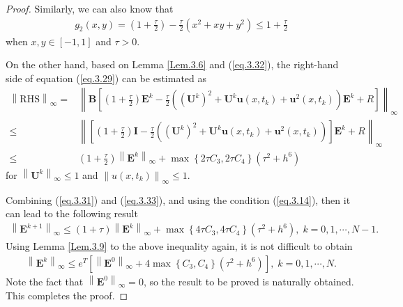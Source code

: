 \documentclass{siamart171218}
\numberwithin{theorem}{section}
\numberwithin{equation}{section}
\begin{document}
\begin{proof}
Similarly, we can also know that
\begin{equation}\label{eq.3.32}
\begin{aligned}\displaystyle
g_2(x,y)=\left(1+\frac{\tau}{2}\right)
-\frac{\tau}{2}\left(x^2+
xy
+y^2\right)\leq1+\frac{\tau}{2}
\end{aligned}
\end{equation}
when $x,y\in[-1,1]$ and $\tau>0$.

On the other hand, based on Lemma \ref{Lem.3.6} and (\ref{eq.3.32}), the right-hand
side of equation (\ref{eq.3.29})
can be estimated as
\begin{equation}\label{eq.3.33}
\begin{aligned}\displaystyle
\left\|\mathrm{RHS}\right\|_\infty=&\left\|\mathbf{B}
\left[\left(1+\frac{\tau}{2}\right)\mathbf{E}^{k}
-\frac{\tau}{2}\left(\left(\mathbf{U}^{k}\right)^2+
\mathbf{U}^{k}\mathbf{u}\left(x,t_{k}\right)
+\mathbf{u}^2\left(x,t_{k}\right)\right)\mathbf{E}^{k}+R
\right]\right\|_\infty\\
\leq&
\left\|\left[\left(1+\frac{\tau}{2}\right)\mathbf{I}
-\frac{\tau}{2}\left(\left(\mathbf{U}^{k}\right)^2+
\mathbf{U}^{k}\mathbf{u}\left(x,t_{k}\right)
+\mathbf{u}^2\left(x,t_{k}\right)\right)
\right]\mathbf{E}^{k}+R\right\|_\infty\\
\leq&\left(1+\frac{\tau}{2}\right)\left\|\mathbf{E}^{k}\right\|_\infty
+\max\left\{2\tau C_3, 2\tau C_4\right\}\left(\tau^2+h^6\right)
\end{aligned}
\end{equation}
for  $\left\|\mathbf{U}^{k}\right\|_\infty\leq1$
and $\left\|u\left(x,t_{k}\right)\right\|_\infty\leq1$.

Combining (\ref{eq.3.31}) and (\ref{eq.3.33}), and using the condition (\ref{eq.3.14}),
then it can lead to the following result
\begin{equation*}
\begin{aligned}\displaystyle
\left\|\mathbf{E}^{k+1}\right\|_\infty\leq\left(1+{\tau}\right)\left\|\mathbf{E}^{k}\right\|_\infty
+\max\left\{4\tau C_3, 4\tau C_4\right\}\left(\tau^2+h^6\right),\;k=0,1,\cdots,N-1.
\end{aligned}
\end{equation*}
Using Lemma \ref{Lem.3.9} to the above inequality again, it is not difficult to obtain
\begin{equation*}
\begin{aligned}\displaystyle
\left\|\mathbf{E}^{k}\right\|_\infty \leq e^T\left[\left\|\mathbf{E}^{0}\right\|_\infty
+4\max\left\{C_3,C_4\right\}\left(\tau^2+h^6\right)\right],\;k=0,1,\cdots,N.
\end{aligned}
\end{equation*}
Note the fact that $\left\|\mathbf{E}^{0}\right\|_\infty=0$, so the result to be
 proved is naturally obtained. This completes the proof.
\end{proof}
\end{document}
